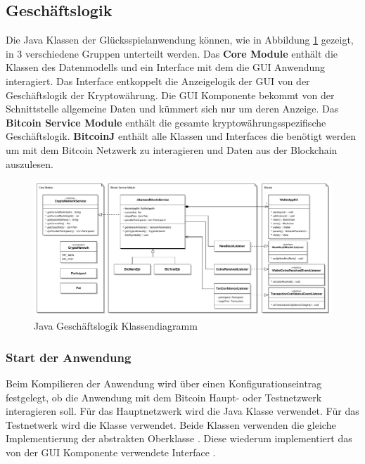 \subsection{Geschäftslogik}

Die Java Klassen der Glücksspielanwendung können, wie in Abbildung \ref{fig:btc_businesslogic} gezeigt, in 3 verschiedene Gruppen unterteilt werden. Das \textbf{Core Module} enthält die Klassen des Datenmodells und ein Interface mit dem die GUI Anwendung interagiert. Das Interface entkoppelt die Anzeigelogik der GUI von der Geschäftslogik der Kryptowährung. Die GUI Komponente bekommt von der Schnittstelle allgemeine Daten und kümmert sich nur um deren Anzeige.
Das \textbf{Bitcoin Service Module} enthält die gesamte kryptowährungsspezifische Geschäftslogik. \textbf{BitcoinJ} enthält alle Klassen und Interfaces die benötigt werden um mit dem Bitcoin Netzwerk zu interagieren und Daten aus der Blockchain auszulesen.

\begin{figure}[H]
\centering
\includegraphics[width=1\linewidth]{Figures/umsetzung_btc/btc_businesslogic_pdf}
\decoRule
\caption{Java Geschäftslogik Klassendiagramm}
\label{fig:btc_businesslogic}
\end{figure}

\subsubsection{Start der Anwendung}
Beim Kompilieren der Anwendung wird über einen Konfigurationseintrag festgelegt, ob die Anwendung mit dem Bitcoin Haupt- oder Testnetzwerk interagieren soll.
Für das Hauptnetzwerk wird die Java Klasse  verwendet. Für das Testnetwerk wird die Klasse  verwendet. Beide Klassen verwenden die gleiche Implementierung der abstrakten Oberklasse . Diese wiederum implementiert das von der GUI Komponente verwendete Interface .


